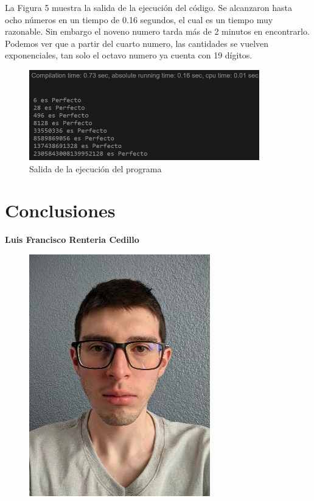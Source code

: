 \documentclass[12pt,twoside]{article}
\begin{document}
La Figura 5 muestra la salida de la ejecución del código. Se alcanzaron hasta ocho números en un tiempo de 0.16 segundos, el cual es un tiempo muy razonable. Sin embargo el noveno numero tarda más de 2 minutos en encontrarlo. Podemos ver que a partir del cuarto numero, las cantidades se vuelven exponenciales, tan solo el octavo numero ya cuenta con 19 dígitos.

\begin{figure}[h]
    \centering
    \includegraphics[width=10cm]{imagenes/salida2-2a.png}
    \caption{Salida de la ejecución del programa}
    \label{fig:my_label}
\end{figure}  

\clearpage
\newpage


\section{Conclusiones}
\textbf{\large Luis Francisco Renteria Cedillo}
\begin{figure}[H]
    \centering
    \includegraphics[angle=0, scale=0.5]{imagenes/foto1.png}
\end{figure}
\end{document}
